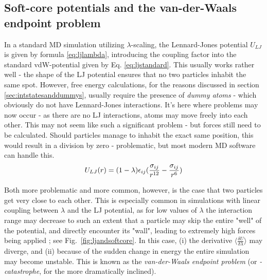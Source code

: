 \documentclass[oneside]{scrreprt}
\begin{document}
\subsection{Soft-core potentials and the van-der-Waals endpoint problem} \label{sec:vdwproblem}
In a standard MD simulation utilizing $\lambda$-scaling, the Lennard-Jones potential $U_{LJ}$ is given by formula \ref{eq:ljlambda}, introducing the coupling factor into the standard vdW-potential given by Eq. \ref{eq:ljstandard}. This usually works rather well -  the shape of the LJ potential ensures that no two  particles inhabit the same spot. However, free energy calculations, for the reasons discussed in section \ref{sec:intstatesanddummys}, usually require the presence of \textit{dummy atoms} - which obviously do not have Lennard-Jones interactions. It's here where problems may now occur -  as there are no LJ interactions, atoms may move freely into each other. This may not seem like such a significant problem - but forces still need to be calculated. Should particles manage to inhabit the exact same position, this would result in a division by zero - problematic, but most modern MD software can handle this. 
\begin{equation}
U_{LJ}(r)=(1-\lambda)\epsilon_{ij}(\frac{\sigma_{ij}}{r^{12}} - \frac{\sigma_{ij}}{r^6}) \label{eq:ljlambda} \\
\end{equation}

Both more problematic and more common, however, is the case that two particles get very close to each other. This is especially common in simulations with linear coupling between $\lambda$ and the LJ potential, as for low values of $\lambda$ the interaction range may decrease to such an extent that a particle may skip the entire "well" of the potential, and directly encounter its "wall", leading to extremely high forces being applied \cite{Beutler1994Jun,boresch_avoiding_2011}; see Fig.~\ref{fig:ljandsoftcore}. In this case, (i) the derivative $\langle \frac{\delta U}{\delta\lambda} \rangle$ may diverge, and (ii) because of the sudden change in energy the entire simulation may become unstable. This is known as the \textit{van-der-Waals endpoint problem} (or \textit{-catastrophe}, for the more dramatically inclined).
\end{document}

